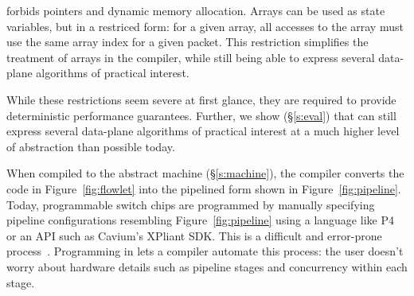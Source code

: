 \pktlanguage forbids pointers and dynamic memory allocation. Arrays can be used
as state variables, but in a restriced form: for a given array, all accesses to
the array must use the same array index for a given packet. This restriction
simplifies the treatment of arrays in the compiler, while still being able to
express several data-plane algorithms of practical interest.

While these restrictions seem severe at first glance, they are required to
provide deterministic performance guarantees. Further, we show (\S\ref{s:eval})
that \pktlanguage can still express several data-plane algorithms  of practical
interest at a much higher level of abstraction than possible today.

When compiled to the \absmachine abstract machine (\S\ref{s:machine}), the
\pktlanguage compiler converts the code in Figure~\ref{fig:flowlet} into the
pipelined form shown in Figure~\ref{fig:pipeline}. Today, programmable switch
chips are programmed by manually specifying pipeline configurations resembling
Figure~\ref{fig:pipeline} using a language like P4 or an API such as Cavium's
XPliant SDK. This is a difficult and error-prone process~\cite{p4-semantics}.
Programming in \pktlanguage lets a compiler automate this process:
the user doesn't worry about hardware details such as pipeline stages and
concurrency within each stage.
